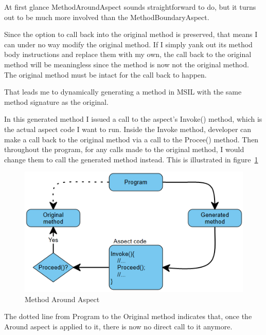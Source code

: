At first glance MethodAroundAspect sounds straightforward to do, but it turns out to be much more involved than the MethodBoundaryAspect.

Since the option to call back into the original method is preserved, that means I can under no way modify the original method. If I simply yank out its method body instructions and replace them with my own, the call back to the original method will be meaningless since the method is now not the original method. The original method must be intact for the call back to happen.

That leads me to dynamically generating a method in MSIL with the same method signature as the original.

In this generated method I issued a call to the aspect’s Invoke() method, which is the actual aspect code I want to run. Inside the Invoke method, developer can make a call back to the original method via a call to the Procee() method. Then throughout the program, for any calls made to the original method, I would change them to call the generated method instead. This is illustrated in figure~\ref{around_overview}

\begin{figure}[H]
  \includegraphics[scale=1.0]{AroundOverview.PNG}
  \centering
  \caption{Method Around Aspect\label{around_overview}}
\end{figure}

The dotted line from Program to the Original method indicates that, once the Around aspect is applied to it, there is now no direct call to it anymore.
